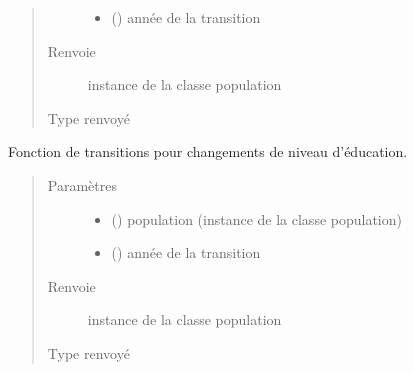 \documentclass[letterpaper,10pt,french]{sphinxmanual}
\begin{document}
\begin{fulllineitems}
\begin{fulllineitems}
\begin{quote}
\begin{description}
\begin{itemize}
\item {} 
 () \textendash{} année de la transition

\end{itemize}

\item[{Renvoie}] \leavevmode
instance de la classe population

\item[{Type renvoyé}] \leavevmode
{\hyperref[\detokenize{code:simgen.population}]{}}

\end{description}\end{quote}

\end{fulllineitems}


\begin{fulllineitems}
\label{\detokenize{code:simgen.update.educ}}
Fonction de transitions pour changements de niveau d’éducation.
\begin{quote}\begin{description}
\item[{Paramètres}] \leavevmode\begin{itemize}
\item {} 
 ({\hyperref[\detokenize{code:simgen.population}]{}}) \textendash{} population (instance de la classe population)

\item {} 
 () \textendash{} année de la transition

\end{itemize}

\item[{Renvoie}] \leavevmode
instance de la classe population

\item[{Type renvoyé}] \leavevmode
{\hyperref[\detokenize{code:simgen.population}]{}}

\end{description}\end{quote}


\end{fulllineitems}
\end{fulllineitems}
\end{document}
